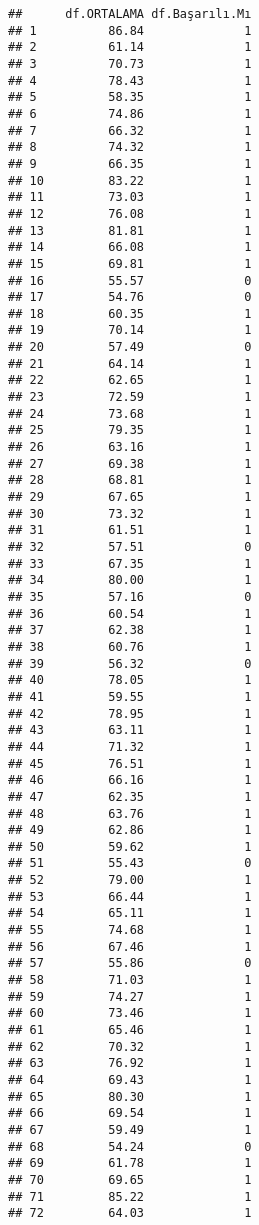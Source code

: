 \documentclass[
]{article}
\begin{document}
\begin{verbatim}
##      df.ORTALAMA df.Başarılı.Mı
## 1          86.84              1
## 2          61.14              1
## 3          70.73              1
## 4          78.43              1
## 5          58.35              1
## 6          74.86              1
## 7          66.32              1
## 8          74.32              1
## 9          66.35              1
## 10         83.22              1
## 11         73.03              1
## 12         76.08              1
## 13         81.81              1
## 14         66.08              1
## 15         69.81              1
## 16         55.57              0
## 17         54.76              0
## 18         60.35              1
## 19         70.14              1
## 20         57.49              0
## 21         64.14              1
## 22         62.65              1
## 23         72.59              1
## 24         73.68              1
## 25         79.35              1
## 26         63.16              1
## 27         69.38              1
## 28         68.81              1
## 29         67.65              1
## 30         73.32              1
## 31         61.51              1
## 32         57.51              0
## 33         67.35              1
## 34         80.00              1
## 35         57.16              0
## 36         60.54              1
## 37         62.38              1
## 38         60.76              1
## 39         56.32              0
## 40         78.05              1
## 41         59.55              1
## 42         78.95              1
## 43         63.11              1
## 44         71.32              1
## 45         76.51              1
## 46         66.16              1
## 47         62.35              1
## 48         63.76              1
## 49         62.86              1
## 50         59.62              1
## 51         55.43              0
## 52         79.00              1
## 53         66.44              1
## 54         65.11              1
## 55         74.68              1
## 56         67.46              1
## 57         55.86              0
## 58         71.03              1
## 59         74.27              1
## 60         73.46              1
## 61         65.46              1
## 62         70.32              1
## 63         76.92              1
## 64         69.43              1
## 65         80.30              1
## 66         69.54              1
## 67         59.49              1
## 68         54.24              0
## 69         61.78              1
## 70         69.65              1
## 71         85.22              1
## 72         64.03              1

\end{verbatim}
\end{document}
